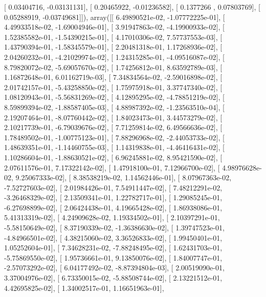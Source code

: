 \documentclass{article}
\begin{document}
       [ 0.03404716, -0.03131131],
       [ 0.20465922, -0.01236582],
       [ 0.1377266 ,  0.07803769],
       [ 0.05288919, -0.03749681]]), array([[  6.49890521e-02,  -1.07772225e-01],
       [  4.49933518e-02,  -1.69004946e-01],
       [  3.91947863e-02,  -4.19900933e-02],
       [  1.52385582e-01,  -1.54390215e-01],
       [  4.17010306e-02,   7.57737553e-03],
       [  1.43790394e-01,  -1.58345579e-01],
       [  2.20481318e-01,   1.17268936e-02],
       [  2.04260232e-01,  -4.21029974e-02],
       [  1.24315285e-01,  -4.09516087e-02],
       [  8.79820072e-02,  -5.69057670e-02],
       [  1.74256812e-01,   8.63592789e-03],
       [  1.16872648e-01,   6.01162719e-03],
       [  7.34834564e-02,  -2.59016898e-02],
       [  2.01742157e-01,  -5.43258850e-02],
       [  1.75975918e-01,   3.37747340e-02],
       [  1.08120943e-01,  -5.56831269e-02],
       [  4.12895295e-02,  -4.78851219e-02],
       [  8.59899394e-02,  -1.88587405e-03],
       [  4.88987392e-02,  -1.23563510e-04],
       [  2.19207464e-01,  -8.07760442e-02],
       [  1.84023473e-01,   3.44573279e-02],
       [  2.10217739e-01,  -6.79039676e-02],
       [  7.71259814e-02,   6.49566636e-02],
       [  1.78489502e-01,  -1.00775123e-01],
       [  7.88296968e-02,  -2.44053733e-02],
       [  1.48639351e-01,  -1.14460755e-03],
       [  1.14319838e-01,  -4.46416431e-02],
       [  1.10286604e-01,  -1.88630521e-02],
       [  6.96245881e-02,   8.95421590e-02],
       [  2.07611576e-01,   7.17322142e-02],
       [  1.47918100e-01,   7.12966700e-02],
       [  4.98976628e-02,   9.25067333e-02],
       [  8.38538219e-02,   1.14562446e-01],
       [  8.07967363e-02,  -7.52727603e-02],
       [  2.01984426e-01,   7.54911447e-02],
       [  7.48212291e-02,  -3.26468329e-02],
       [  2.13509341e-01,   1.22782717e-01],
       [  1.29085245e-01,  -6.27698899e-02],
       [  2.06424438e-01,   4.19665428e-02],
       [  1.86938086e-01,   5.41313319e-02],
       [  4.24909628e-02,   1.19334502e-01],
       [  2.10397291e-01,  -5.58150649e-02],
       [  8.37190339e-02,  -1.36386630e-02],
       [  1.39747523e-01,  -4.84966501e-02],
       [  4.38215060e-02,   3.36526833e-02],
       [  1.99450401e-01,   1.05252604e-01],
       [  7.34628231e-02,  -7.88248495e-02],
       [  1.62431703e-01,  -5.75869550e-02],
       [  1.95736661e-01,   9.13850076e-02],
       [  1.84007747e-01,  -2.57073292e-02],
       [  6.04177492e-02,  -8.87394804e-03],
       [  2.00519090e-01,   3.37004976e-02],
       [  6.73350015e-02,  -5.88508744e-02],
       [  2.13221512e-01,   4.42695825e-02],
       [  1.34002517e-01,   1.16651963e-01],
\end{document}
